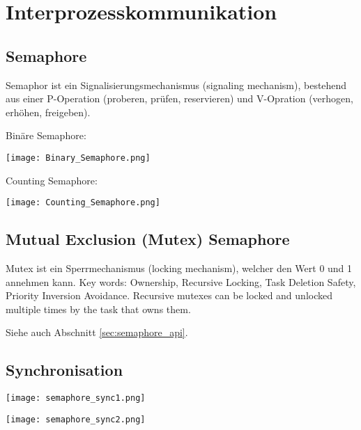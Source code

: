 \section{Interprozesskommunikation}

\subsection{Semaphore}

Semaphor ist ein Signalisierungsmechanismus (signaling mechanism), bestehend aus einer P-Operation (proberen, prüfen, reservieren) und V-Opration (verhogen, erhöhen, freigeben).

Binäre Semaphore:

\texttt{[image: Binary\_Semaphore.png]}

Counting Semaphore:

\texttt{[image: Counting\_Semaphore.png]}

\subsection{Mutual Exclusion (Mutex) Semaphore}

Mutex ist ein Sperrmechanismus (locking mechanism), welcher den Wert 0 und 1 annehmen kann.
Key words: Ownership, Recursive Locking, Task Deletion Safety, Priority Inversion Avoidance.
Recursive mutexes can be locked and unlocked multiple times by the task that owns them.

Siehe auch Abschnitt \ref{sec:semaphore_api}.


\subsection{Synchronisation}

\begin{center}
    \texttt{[image: semaphore\_sync1.png]}

    \texttt{[image: semaphore\_sync2.png]}
\end{center}


